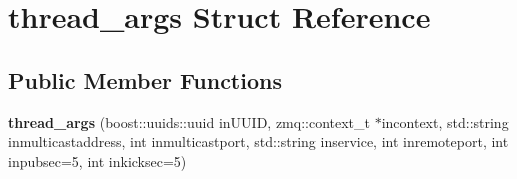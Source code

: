 \hypertarget{structthread__args}{\section{thread\-\_\-args Struct Reference}
\label{structthread__args}
}
\subsection*{Public Member Functions}
\begin{DoxyCompactItemize}
\item 
\hypertarget{structthread__args_a6b3383444ec19a7bd2969229e1b87d2f}{{\bfseries thread\-\_\-args} (boost\-::uuids\-::uuid in\-U\-U\-I\-D, zmq\-::context\-\_\-t $\ast$incontext, std\-::string inmulticastaddress, int inmulticastport, std\-::string inservice, int inremoteport, int inpubsec=5, int inkicksec=5)}\label{structthread__args_a6b3383444ec19a7bd2969229e1b87d2f}

\end{DoxyCompactItemize}
